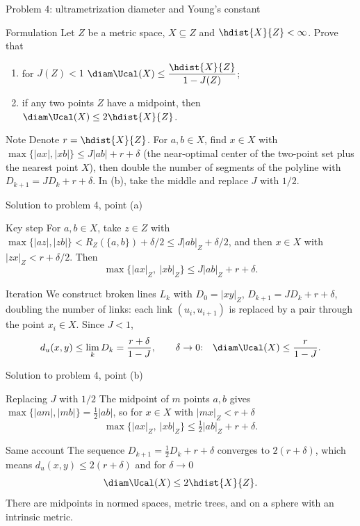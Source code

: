 \documentclass[aspectratio=169,11pt]{beamer}
\begin{document}
\begin{frame}{Problem \textup{4}: ultrametrization diameter and Young's constant}
\begin{block}{Formulation}
Let $Z$ be a metric space, $X \subseteq Z$ and $\hdist{X}{Z} < \infty$. Prove that
\begin{enumerate}
\item[(a)] for $J(Z) < 1$ $\diam\Ucal(X) \le \dfrac{\hdist{X}{Z}}{1 - J(Z)}$\textup{;}
\item[(b)] if any two points $Z$ have a midpoint, then $\diam\Ucal(X) \le 2\hdist{X}{Z}$.
\end{enumerate}
\end{block}
\begin{block}{Note}
Denote $r = \hdist{X}{Z}$. For $a,b \in X$, find $x \in X$ with $\max\{|ax|,|xb|\} \le J|ab| + r + \delta$ (the near-optimal center of the two-point set plus the nearest point $X$), then double the number of segments of the polyline with $D_{k+1} = J D_k + r + \delta$. In \textup{(b)}, take the middle and replace $J$ with $1/2$.
\end{block}
\end{frame}

\begin{frame}{Solution to problem \textup{4}, point \textup{(a)}}
\begin{block}{Key step}
For $a,b \in X$, take $z \in Z$ with $\max\{|az|,|zb|\} < R_Z(\{a,b\}) + \delta/2 \le J|ab|_Z + \delta/2$, and then $x \in X$ with $|zx|_Z < r + \delta/2$. Then
\[
\max\bigl\{|ax|_Z,\ |xb|_Z\bigr\} \le J|ab|_Z + r + \delta .
\]
\end{block}
\begin{block}{Iteration}
We construct broken lines $L_k$ with $D_0 = |xy|_Z$, $D_{k+1} = J D_k + r + \delta$, doubling the number of links\textup{:} each link $(u_i,u_{i+1})$ is replaced by a pair through the point $x_i \in X$. Since $J < 1$,
\[
d_u(x,y) \le \lim_k D_k = \frac{r+\delta}{1-J}, \qquad \delta \to 0\textup{:} \quad \diam\Ucal(X) \le \frac{r}{1-J}.
\]
\end{block}
\end{frame}

\begin{frame}{Solution to problem \textup{4}, point \textup{(b)}}
\begin{block}{Replacing $J$ with $1/2$}
The midpoint of $m$ points $a,b$ gives $\max\{|am|,|mb|\} = \frac12|ab|$, so for $x \in X$ with $|mx|_Z < r+\delta$
\[
\max\bigl\{|ax|_Z,\ |xb|_Z\bigr\} \le \tfrac12|ab|_Z + r + \delta .
\]
\end{block}
\begin{block}{Same account}
The sequence $D_{k+1} = \frac12 D_k + r + \delta$ converges to $2(r+\delta)$, which means $d_u(x,y) \le 2(r+\delta)$ and for $\delta \to 0$
\[
\diam\Ucal(X) \le 2\hdist{X}{Z}.
\]
There are midpoints in normed spaces, metric trees, and on a sphere with an intrinsic metric.
\end{block}
\end{frame}
\end{document}
